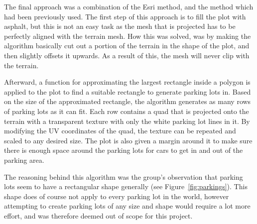 The final approach was a combination of the Esri method, and the method which had been previously used. 
The first step of this approach is to fill the plot with asphalt, but this is not an easy task as the mesh that is projected has to be perfectly aligned with the terrain mesh.
How this was solved, was by making the algorithm basically cut out a portion of the terrain in the shape of the plot, and then slightly offsets it upwards.
As a result of this, the mesh will never clip with the terrain. 

Afterward, a function for approximating the largest rectangle inside a polygon is applied to the plot to find a suitable rectangle to generate parking lots in.
Based on the size of the approximated rectangle, the algorithm generates as many rows of parking lots as it can fit.
Each row contains a quad that is projected onto the terrain with a transparent texture with only the white parking lot lines in it.
By modifying the UV coordinates of the quad, the texture can be repeated and scaled to any desired size. 
The plot is also given a margin around it to make sure there is enough space around the parking lots for cars to get in and out of the parking area.

The reasoning behind this algorithm was the group's observation that parking lots seem to have a rectangular shape generally (see Figure~\ref{fig:parkings}).
This shape does of course not apply to every parking lot in the world, however attempting to create parking lots of any size and shape would require a lot more effort, and was therefore deemed out of scope for this project. 

